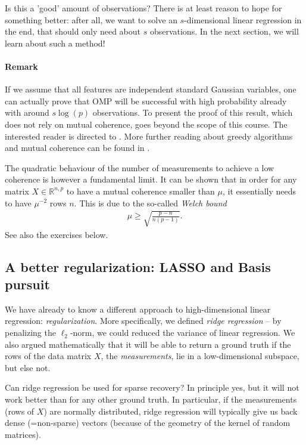 \documentclass{article}
\newcommand{\R}{\mathbb{R}}
\begin{document}
Is this a 'good' amount of observations? There is at least reason to hope for something better:  after all, we want to solve an $s$-dimensional linear regression in the end, that should only need about $s$ observations. In the next section, we will learn about such a method!

\paragraph{Remark} If we assume that all features are independent standard Gaussian variables, one can actually prove that OMP will be successful with high probability already with around $s\log(p)$ observations. To present the proof of this result, which does not rely on mutual coherence, goes beyond the scope of this course. The interested reader is directed to \cite{tropp2007signal}. More further reading about greedy algorithms and mutual coherence can be found in \cite[Ch.3,5]{FouRau2013}.

The quadratic behaviour of the number of measurements to achieve a low coherence is however a fundamental limit. It can be shown that in order for any matrix $X\in \R^{n,p}$ to have a mutual coherence smaller than $\mu$, it essentially needs to have $\mu^{-2}$ rows $n$. This is due to the so-called \emph{Welch bound} \cite{WelchBound}
\begin{align*}
    \mu \geq \sqrt{\frac{p-n}{n(p-1)}}.
\end{align*}
See also the exercises below.

\subsection{A better regularization: LASSO and Basis pursuit}
We have already to know a different approach to high-dimensional linear regression: \emph{regularization}. More specifically, we defined \emph{ridge regression} -- by penalizing the $\ell_2$-norm, we could reduced the variance of linear regression. We also argued mathematically that it will be able to return a ground truth if the rows of the data matrix $X$, the \emph{measurements}, lie in a low-dimensional subspace, but else not.

Can ridge regression be used for sparse recovery? In principle yes, but it will not work better than for any other ground truth. In particular, if the measurements (rows of $X$) are normally distributed, ridge regression will typically give us back dense (=non-sparse) vectors (because of the geometry of the kernel of random matrices). 
\end{document}
